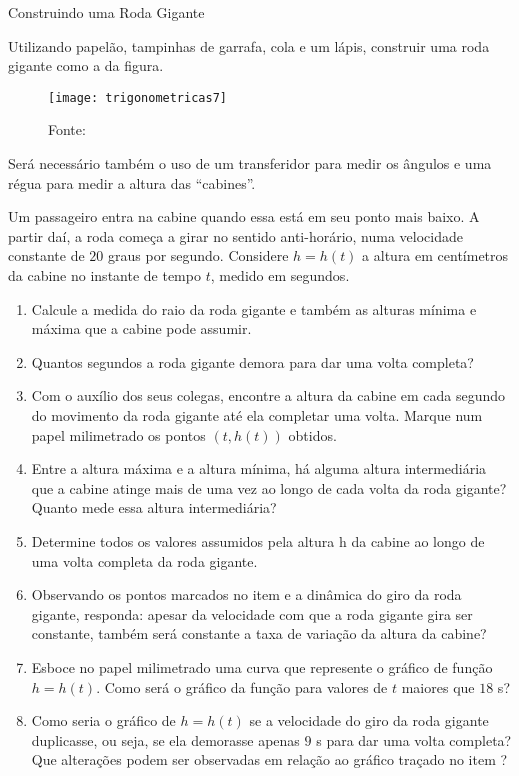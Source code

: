 \begin{task}{Construindo uma Roda Gigante}
\label{trig-ativ3}

Utilizando papelão, tampinhas de garrafa, cola e um lápis, construir uma roda gigante como a da figura.

\begin{figure}[H]
\centering

\texttt{[image: trigonometricas7]}
\caption{Fonte: \cite{soares2010}}

\end{figure}

Será necessário também o uso de um transferidor para medir os ângulos e uma régua para medir a altura das “cabines”.

Um passageiro entra na cabine quando essa está em seu ponto mais baixo. A partir daí, a roda começa a girar no sentido anti-horário, numa velocidade constante de $20$ graus por segundo. Considere $h = h(t)$ a altura em centímetros da cabine no instante de tempo $t$, medido em segundos.
\begin{enumerate}
\item Calcule a medida do raio da roda gigante e também as alturas mínima e máxima que a cabine pode assumir.
\item Quantos segundos a roda gigante demora para dar uma volta completa?
\item Com o auxílio dos seus colegas, encontre a altura da cabine em cada segundo do movimento da roda gigante até ela completar uma volta. Marque num papel milimetrado os pontos $(t,h(t))$ obtidos.
\item Entre a altura máxima e a altura mínima, há alguma altura intermediária que a cabine atinge mais de uma vez ao longo de cada volta da roda gigante? Quanto mede essa altura intermediária?
\item Determine todos os valores assumidos pela altura h da cabine ao longo de uma volta completa da roda gigante.
\item Observando os pontos marcados no item  e a dinâmica do giro da roda gigante, responda: apesar da velocidade com que a roda gigante gira ser constante, também será constante a taxa de variação da altura da cabine?  
\item Esboce no papel milimetrado uma curva que represente o gráfico de função $h = h(t)$. Como será o gráfico da função para valores de $t$ maiores que $18$ s?
\item Como seria o gráfico de $h = h(t)$ se a velocidade do giro da roda gigante duplicasse, ou seja, se ela demorasse apenas $9$ s para dar uma volta completa? Que alterações podem ser observadas em relação ao gráfico traçado no item ?
\end{enumerate}

\end{task}


